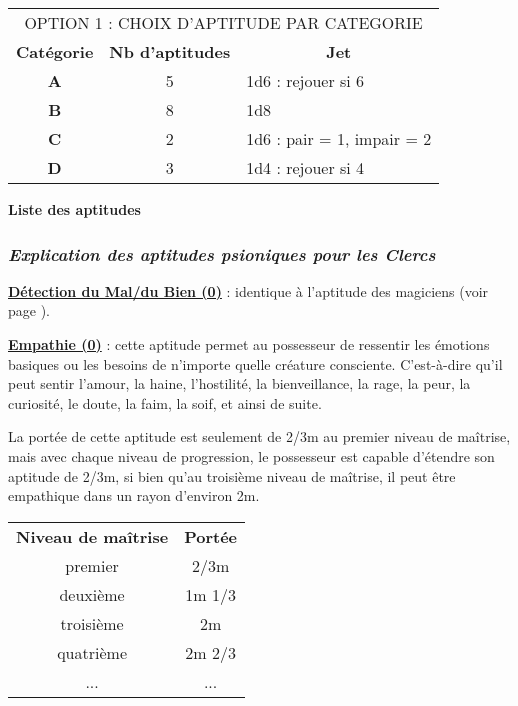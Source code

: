 \bigskip

\begin{tabular}{ccl}
\multicolumn{3}{c}{OPTION 1 : CHOIX D'APTITUDE PAR CATEGORIE} \\
\textbf{Catégorie} &  \textbf{Nb d'aptitudes} & \multicolumn{1}{c}{\textbf{Jet}} \\
\textbf{A} & 5 & 1d6 : rejouer si 6 \\
\textbf{B} & 8 & 1d8 \\
\textbf{C} & 2 & 1d6 : pair = 1, impair = 2 \\
\textbf{D} & 3 & 1d4 : rejouer si 4 \\
\end{tabular}

\bigskip

\textbf{Liste des aptitudes}

\bigskip


\subsubsection*{\textit{Explication des aptitudes psioniques pour les Clercs}}

\textbf{\uline{Détection du Mal/du Bien (0)}} : identique à l'aptitude des magiciens (voir page \pageref{magicien-detection-mal}).

\bigskip

\label{clerc-empathie}\textbf{\uline{Empathie (0)}} : cette aptitude permet au possesseur de ressentir les émotions basiques ou les besoins de n'importe quelle créature consciente. C'est-à-dire qu'il peut sentir l'amour, la haine, l'hostilité, la bienveillance, la rage, la peur, la curiosité, le doute, la faim, la soif, et ainsi de suite.

\bigskip

La portée de cette aptitude est seulement de 2/3m au premier niveau de maîtrise, mais avec chaque niveau de progression, le possesseur est capable d'étendre son aptitude de 2/3m, si bien qu'au troisième niveau de maîtrise, il peut être empathique dans un rayon d'environ 2m.

\bigskip

\begin{tabular}{cc}
\textbf{Niveau de maîtrise} & \textbf{Portée}\\
premier     & 2/3m   \\
deuxième    & 1m 1/3   \\
troisième   & 2m  \\
quatrième   & 2m 2/3 \\
...         & ...    \\
\end{tabular}

